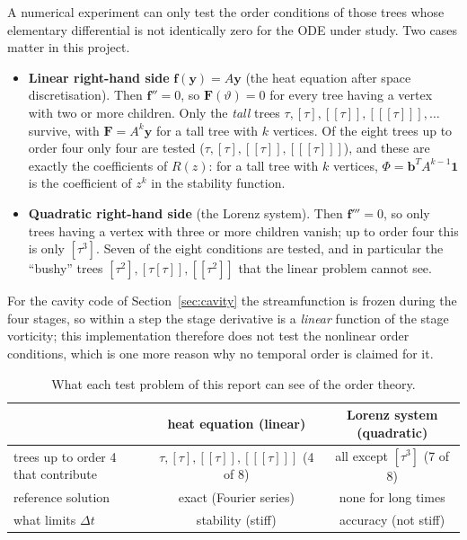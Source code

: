 \documentclass[11pt,a4paper]{article}
\newcommand{\Dt}{\Delta t}
\newcommand{\bfy}{\mathbf{y}}
\newcommand{\bff}{\mathbf{f}}
\begin{document}
A numerical experiment can only test the order conditions of those trees whose elementary differential is not identically zero for
the ODE under study. Two cases matter in this project.
\begin{itemize}[leftmargin=*]
\item \textbf{Linear right-hand side} $\bff(\bfy)=A\bfy$ (the heat equation after space discretisation). Then $\bff''=0$, so $\mathbf F(\vartheta)=0$
for every tree having a vertex with two or more children. Only the \emph{tall} trees $\tau,[\tau],[[\tau]],[[[\tau]]],\dots$ survive,
with $\mathbf F=A^{k}\bfy$ for a tall tree with $k$ vertices. Of the eight trees up to order four only four are tested
($\tau,[\tau],[[\tau]],[[[\tau]]]$), and these are exactly the coefficients of $R(z)$: for a tall tree with $k$ vertices,
$\Phi=\mathbf b^TA^{k-1}\mathbf1$ is the coefficient of $z^k$ in the stability function.
\item \textbf{Quadratic right-hand side} (the Lorenz system). Then $\bff'''=0$, so only trees having a vertex with three or more children
vanish; up to order four this is only $[\tau^3]$. Seven of the eight conditions are tested, and in particular the ``bushy'' trees
$[\tau^2],[\tau[\tau]],[[\tau^2]]$ that the linear problem cannot see.
\end{itemize}
For the cavity code of Section~\ref{sec:cavity} the streamfunction is frozen during the four stages, so within a step the stage
derivative is a \emph{linear} function of the stage vorticity; this implementation therefore does not test the nonlinear order
conditions, which is one more reason why no temporal order is claimed for it.
\begin{table}[H]
\centering
\begin{tabular}{@{}lcc@{}}
\toprule
 & heat equation (linear) & Lorenz system (quadratic)\\
\midrule
trees up to order 4 that contribute & $\tau,[\tau],[[\tau]],[[[\tau]]]$ (4 of 8) & all except $[\tau^3]$ (7 of 8)\\
reference solution & exact (Fourier series) & none for long times\\
what limits $\Dt$ & stability (stiff) & accuracy (not stiff)\\
\bottomrule
\end{tabular}
\caption{What each test problem of this report can see of the order theory.}
\label{tab:detect}
\end{table}

\end{document}
